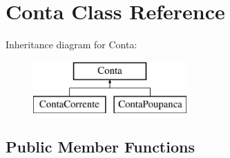 \hypertarget{classConta}{}\section{Conta Class Reference}
\label{classConta}
Inheritance diagram for Conta\+:\begin{figure}[H]
\begin{center}
\leavevmode
\includegraphics[height=2.000000cm]{classConta}
\end{center}
\end{figure}
\subsection*{Public Member Functions}
